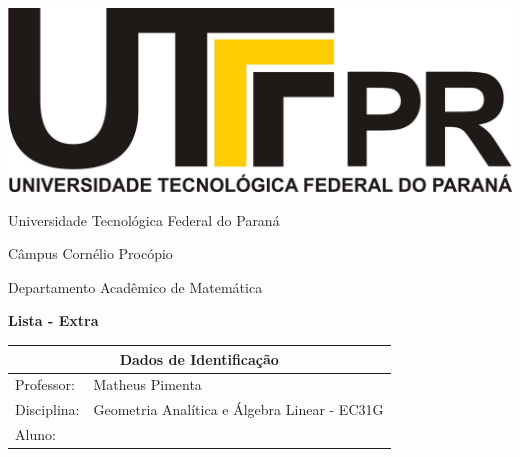 \documentclass[oneside,a4paper,12pt]{article}
\newcommand{\universidade}{Universidade Tecnológica Federal do Paraná}
\newcommand{\centro}{Câmpus Cornélio Procópio}
\newcommand{\departamento}{Departamento Acadêmico de Matemática}
\newcommand{\curso}{Engenharia da Computação}
\newcommand{\professores}{Matheus Pimenta}
\newcommand{\disciplina}{Geometria Analítica e Álgebra Linear - EC31G}
\begin{document}
	\pagestyle{empty}
	
	\begin{center}
		\includegraphics[width=\linewidth/8]{logo.jpg}%
	 	\vspace{2pt} 	
		
		\universidade
		\par
		\centro
		\par
		\departamento
		\par
		\par
		\vspace{12pt}
		\LARGE \textbf{Lista - Extra}
		
	\end{center}
	
	\vspace{12pt}
	
	\begin{tabular}{ |l|p{12cm}| }
		
		\hline
		\multicolumn{2}{|c|}{\textbf{Dados de Identificação}} \\
		\hline
		Professor:         &    \professores           \\
		\hline
		Disciplina:        &    \disciplina          \\
		\hline
		Aluno:             &                   \\
		\hline
		
	\end{tabular}
	\vspace{6pt}
	
	
	\begin{snugshade}
	\end{snugshade}
\end{document}
